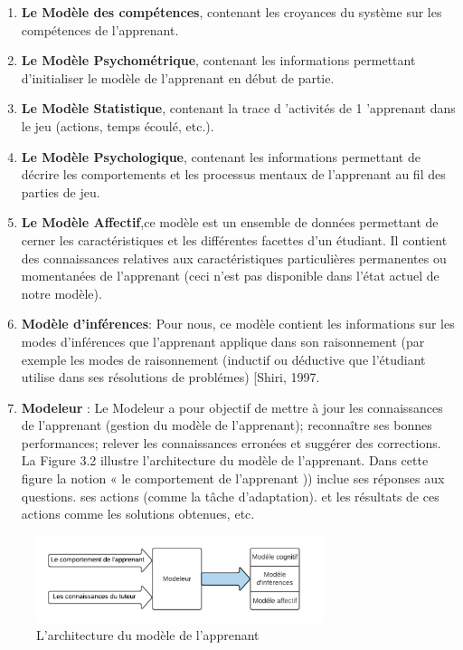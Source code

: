\begin{enumerate}
\item  \textbf{Le Modèle des compétences}, contenant les croyances du système sur les compétences de l'apprenant. 
\item \textbf{Le Modèle Psychométrique}, contenant les informations permettant d'initialiser le modèle de l'apprenant en début de partie.
\item \textbf{Le Modèle Statistique}, contenant la trace d 'activités de 1 'apprenant dans le jeu (actions, temps écoulé, etc.).
\item \textbf{Le Modèle Psychologique}, contenant les informations permettant de décrire les comportements et les processus mentaux de l'apprenant au fil des parties de jeu. 
\item \textbf{Le Modèle Affectif},ce modèle est un ensemble de données permettant de cerner les caractéristiques et les différentes facettes d'un étudiant. Il contient des connaissances relatives aux caractéristiques particulières permanentes ou momentanées de l'apprenant (ceci n'est pas disponible dans l'état actuel de notre modèle). 
\item \textbf{Modèle d'inférences}: Pour nous, ce modèle contient les informations sur les modes d'inférences que l'apprenant applique dans son raisonnement (par exemple les modes de
raisonnement (inductif ou déductive que l'étudiant utilise dans ses résolutions de
problémes) [Shiri, 1997.
\item \textbf{Modeleur} : Le Modeleur a pour objectif de mettre à jour les connaissances de l'apprenant (gestion du modèle de l'apprenant); reconnaître ses bonnes performances; relever les connaissances erronées et suggérer des corrections. La Figure 3.2 illustre l'architecture du modèle de l'apprenant. Dans cette figure la notion « le comportement de l'apprenant )) inclue ses réponses aux questions. ses actions (comme la tâche d'adaptation). et les résultats de ces actions comme les solutions obtenues, etc.
\end{enumerate}
\begin{figure}
    \includegraphics[width=0.75\textwidth]{figures/md_inf.png}
    \captionsetup{justification=centering}
    \caption{ L'architecture du modèle de l'apprenant }
 \label{fig:2}
\end{figure}
\\\


